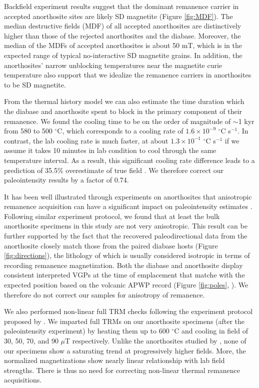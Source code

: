 \documentclass[draft]{agujournal2019}
\begin{document}
Backfield experiment results suggest that the dominant remanence carrier in accepted anorthosite sites are likely SD magnetite (Figure \ref{fig:MDF}). The median destructive fields (MDF) of all accepted anorthosites are distinctively higher than those of the rejected anorthosites and the diabase. Moreover, the median of the MDFs of accepted anorthosites is about 50 mT, which is in the expected range of typical no-interactive SD magnetite grains. In addition, the anorthosites' narrow unblocking temperatures near the magnetite curie temperature also support that we idealize the remanence carriers in anorthosites to be SD magnetite. 

From the thermal history model we can also estimate the time duration which the diabase and anorthosite spent to block in the primary component of their remanence. We found the cooling time to be on the order of magnitude of $\sim$1 kyr from 580 to 500 $^\circ$C, which corresponds to a cooling rate of $1.6\times10^{-9}$ $^\circ$C s$^{-1}$. In contrast, the lab cooling rate is much faster, at about $1.3\times10^{-1}$ $^\circ$C s$^{-1}$ if we assume it takes 10 minutes in lab condition to cool through the same temperature interval. As a result, this significant cooling rate difference leads to a prediction of 35.5\% overestimate of true field \cite{Halgedahl1980a}. We therefore correct our paleointensity results by a factor of 0.74. 

It has been well illustrated through experiments on anorthosites that anisotropic remanence acquisition can have a significant impact on paleointensity estimates \cite{Selkin2000a}. Following similar experiment protocol, we found that at least the bulk anorthosite specimens in this study are not very anisotropic. This result can be further supported by the fact that the recovered paleodirectional data from the anorthosite closely match those from the paired diabase hosts (Figure \ref{fig:directions}), the lithology of which is usually considered isotropic in terms of recording remanence magnetization. Both the diabase and anorthosite display consistent interpreted VGPs at the time of emplacement that matche with the expected position based on the volcanic APWP record (Figure \ref{fig:poles}, ). We therefore do not correct our samples for anisotropy of remanence. 

We also performed non-linear full TRM checks following the experiment protocol proposed by . We imparted full TRMs on our anorthosite specimens (after the paleointensity experiment) by heating them up to 600 $^\circ$C and cooling in field of 30, 50, 70, and 90 $\mu$T respectively. Unlike the anorthosites studied by , none of our specimens show a saturating trend at progressively higher fields. More, the normalized magnetizations show nearly linear relationship with lab field strengths. There is thus no need for correcting non-linear thermal remanence acquisitions. 
\end{document}
